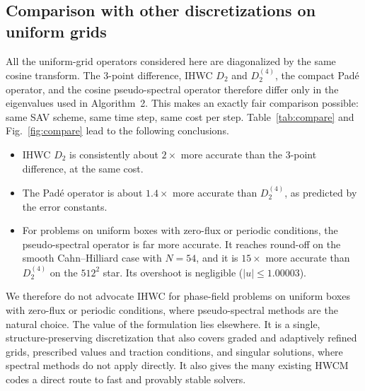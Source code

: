 \documentclass[preprint,12pt]{elsarticle}
\theoremstyle{remark}
\begin{document}
\subsection{Comparison with other discretizations on uniform grids}\label{sec:compare}
All the uniform-grid operators considered here are diagonalized by the same cosine transform. The
3-point difference, IHWC $D_2$ and $D_2^{(4)}$, the compact Pad\'e operator, and the cosine
pseudo-spectral operator therefore differ only in the eigenvalues used in Algorithm~2. This makes an
exactly fair comparison possible: same SAV scheme, same time step, same cost per step.
Table~\ref{tab:compare} and Fig.~\ref{fig:compare} lead to the following conclusions.
\begin{itemize}
\item IHWC $D_2$ is consistently about $2\times$ more accurate than the 3-point difference, at the same
cost.
\item The Pad\'e operator is about $1.4\times$ more accurate than $D_2^{(4)}$, as predicted by the error
constants.
\item For problems on uniform boxes with zero-flux or periodic conditions, the pseudo-spectral operator
is far more accurate. It reaches round-off on the smooth Cahn--Hilliard case with $N=54$, and it is
$15\times$ more accurate than $D_2^{(4)}$ on the $512^2$ star. Its overshoot is negligible
($|u|\le1.00003$).
\end{itemize}
We therefore do not advocate IHWC for phase-field problems on uniform boxes with zero-flux or periodic
conditions, where pseudo-spectral methods are the natural choice. The value of the formulation lies
elsewhere. It is a single, structure-preserving discretization that also covers graded and adaptively
refined grids, prescribed values and traction conditions, and singular solutions, where spectral
methods do not apply directly. It also gives the many existing HWCM codes a direct route to fast and
provably stable solvers.
\end{document}
